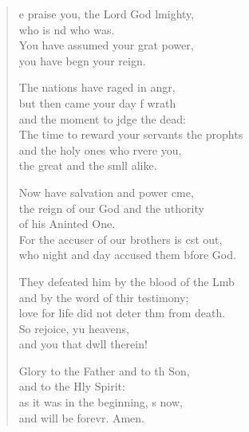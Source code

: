 \settowidth{\versewidth}{The time to reward your servants the prophets +}
\begin{verse}%
  \begin{patverse}
e praise you, the Lord God lmighty,\Med\\
who is nd who was.\\
You have assumed your grat power,\Med\\
you have begn your reign.

The nations have raged in angr,\Flex\\
but then came your day f wrath\Med\\
and the moment to jdge the dead:\\
The time to reward your servants the prophts\Flex\\
and the holy ones who rvere you,\Med\\
the great and the smll alike.

Now have salvation and power cme,\Flex\\
the reign of our God and the uthority\Med\\
of his Aninted One.\\
For the accuser of our brothers is cst out,\Med\\
who night and day accused them bfore God.

They defeated him by the blood of the Lmb\Flex\\
and by the word of thir testimony;\Med\\
love for life did not deter thm from death.\\
So rejoice, yu heavens,\Med\\
and you that dwll therein!

Glory to the Father and to th Son,\Med\\
and to the Hly Spirit:\\
as it was in the beginning, s now,\Med\\
and will be forevr. Amen. 
  \end{patverse}
\end{verse}
